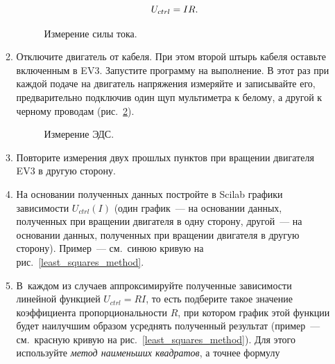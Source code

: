 \documentclass[12pt, a4paper, openany]{extarticle}
\begin{document}
\begin{enumerate}
\begin{enumerate}
\begin{equation}
	U_{ctrl} = IR\ldotp
\end{equation}
\begin{figure}[h]
	\caption{Измерение силы тока.}
	\label{sila_toka}
\end{figure}
\item \label{EiiliNaprazh}Отключите двигатель от кабеля. При этом второй штырь кабеля оставьте включенным в EV3. Запустите программу на выполнение. В этот раз при каждой подаче на двигатель напряжения измеряйте и записывайте его, предварительно подключив один щуп мультиметра к белому, а другой к черному проводам (рис.~\ref{naprazh}).

\begin{figure}[h]
	\caption{Измерение ЭДС.}
	\label{naprazh}
\end{figure}
\item Повторите измерения двух прошлых пунктов при вращении двигателя EV3 в другую сторону.
\item На основании полученных данных постройте в Scilab графики зависимости $U_{ctrl}(I)$ (один график~--- на основании данных, полученных при вращении двигателя в одну сторону, другой~--- на основании данных, полученных при вращении двигателя в другую сторону).
Пример~--- см.~синюю кривую на рис.~\ref{least_squares_method}.
\item В~каждом из случаев аппроксимируйте полученные зависимости линейной функцией $U_{ctrl} = RI$, то есть подберите такое значение коэффициента пропорциональности $R$, при котором график этой функции будет наилучшим образом усреднять полученный результат (пример~--- см.~красную кривую на рис.~\ref{least_squares_method}). Для этого используйте \textit{метод наименьших квадратов}, а точнее формулу
\begin{equation}

\end{equation}
\end{enumerate}
\end{enumerate}
\end{document}
